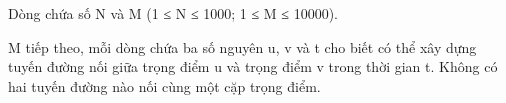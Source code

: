 Dòng chứa số N và M (1 ≤ N ≤ 1000; 1 ≤ M ≤ 10000).  

   M tiếp theo, mỗi dòng chứa ba số nguyên u, v và t cho biết có thể xây dựng tuyến đường nối giữa trọng điểm u và trọng điểm v trong thời gian t. Không có hai tuyến đường nào nối cùng một cặp trọng điểm.  

\